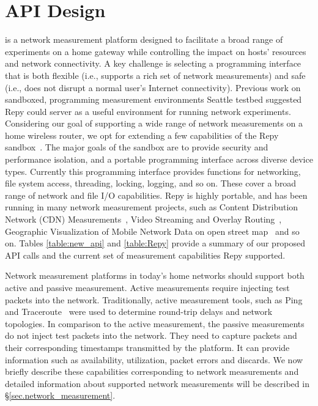 \section{API Design}
{\raggedright
\sysname is a network measurement platform designed to facilitate a broad range of experiments on a home gateway while controlling the impact on hosts' resources and network connectivity. A key challenge is selecting a programming interface that is both flexible (i.e., supports a rich set of network measurements) and safe (i.e., does not disrupt a normal user's Internet connectivity). Previous work on sandboxed, programming measurement environments Seattle testbed suggested Repy could server as a useful environment for running network experiments. Considering our goal of supporting a wide range of network measurements on a home wireless router, we opt for extending a few capabilities of the Repy sandbox~\cite{cappos2010retaining}. The major goals of the sandbox are to provide security and performance isolation, and a portable programming interface across diverse device types. Currently this programming interface provides functions for networking, file system access, threading, locking, logging, and so on. These cover a broad range of network and file I/O capabilities. Repy is highly portable, and has been running in many network measurement projects, such as Content Distribution Network (CDN) Measurements~\cite{rafetseder2011exploring}, Video Streaming and Overlay Routing~\cite{eisl2011service}, Geographic Visualization of Mobile Network Data on open street map~\cite{open3gmap} and so on. Tables \ref{table:new_api} and \ref{table:Repy} provide a summary of our proposed API calls and the current set of measurement capabilities Repy supported. 

Network measurement platforms in today's home networks should support both active and passive measurement. Active measurements require injecting test packets into the network. Traditionally, active measurement tools, such as Ping~\cite{ping} and Traceroute~\cite{traceroute} were used to determine round-trip delays and network topologies. In comparison to the active measurement, the passive measurements do not inject test packets into the network. They need to capture packets and their corresponding timestamps transmitted by the platform. It can provide information such as availability, utilization, packet errors and discards\cite{calyamactive}. We now briefly describe these capabilities corresponding to network measurements and detailed information about supported network measurements will be described in \S{\ref{sec.network_measurement}}.

}
